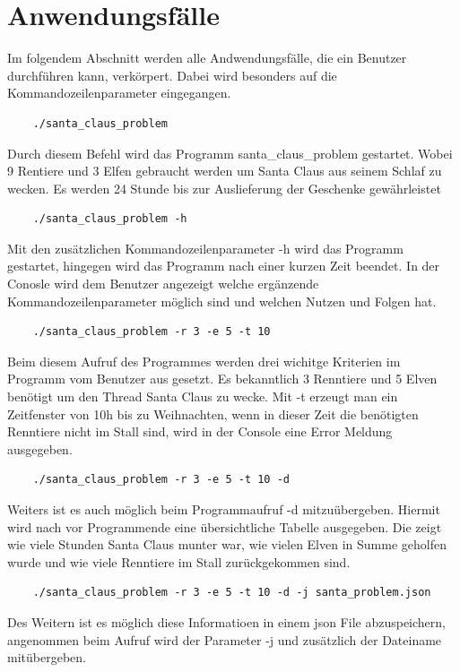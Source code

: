 \documentclass[a4paper,12pt]{article}
\begin{document}
\section{Anwendungsfälle}
Im folgendem Abschnitt werden alle Andwendungsfälle, die ein Benutzer durchführen kann, verkörpert. Dabei wird besonders auf
die Kommandozeilenparameter eingegangen.
\\
\begin{verbatim}
    ./santa_claus_problem
\end{verbatim}
Durch diesem Befehl wird das Programm santa\_claus\_problem gestartet. Wobei 9 Rentiere und 3 Elfen
gebraucht werden um Santa Claus aus seinem Schlaf zu wecken. Es werden 24 Stunde bis zur Auslieferung der Geschenke gewährleistet
\\
\begin{verbatim}
    ./santa_claus_problem -h
\end{verbatim}
Mit den zusätzlichen Kommandozeilenparameter -h wird das Programm gestartet, hingegen wird das Programm
nach einer kurzen Zeit beendet. In der Conosle wird dem Benutzer angezeigt welche ergänzende Kommandozeilenparameter
möglich sind und welchen Nutzen und Folgen hat.
\\
\begin{verbatim}
    ./santa_claus_problem -r 3 -e 5 -t 10
\end{verbatim}
Beim diesem Aufruf des Programmes werden drei wichitge Kriterien im Programm vom Benutzer aus gesetzt.
Es bekanntlich 3 Renntiere und 5 Elven benötigt um den Thread Santa Claus zu wecke. Mit -t erzeugt man ein Zeitfenster von 10h
bis zu Weihnachten, wenn in dieser Zeit die benötigten Renntiere nicht im Stall sind, wird in der Console eine Error Meldung ausgegeben.
\\
\begin{verbatim}
    ./santa_claus_problem -r 3 -e 5 -t 10 -d
\end{verbatim}
Weiters ist es auch möglich beim Programmaufruf -d mitzuübergeben. Hiermit wird nach vor Programmende
eine übersichtliche Tabelle ausgegeben. Die zeigt wie viele Stunden Santa Claus munter war, wie vielen Elven in Summe geholfen wurde und wie viele
Renntiere im Stall zurückgekommen sind.
\\
\begin{verbatim}
    ./santa_claus_problem -r 3 -e 5 -t 10 -d -j santa_problem.json
\end{verbatim}
Des Weitern ist es möglich diese Informatioen in einem json File abzuspeichern, angenommen beim Aufruf wird
der Parameter -j und zusätzlich der Dateiname mitübergeben. 
\\
\end{document}
